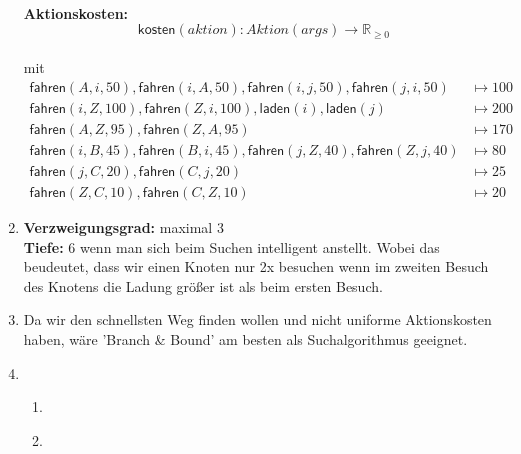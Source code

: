 \documentclass[a4paper,10pt]{article}
\begin{document}
\begin{enumerate}[~~a)]
\begin{enumerate}[~~1.]
\begin{align*}
    \end{align*}
    \end{enumerate}
    \textbf{Aktionskosten:} \\
    $$\textsf{kosten}(aktion): Aktion(args) \rightarrow \mathbb R_{\ge 0}$$\\   mit
    \begin{align*}
    \textsf{fahren}(A,i,50), \textsf{fahren}(i,A,50), \textsf{fahren}(i,j,50), \textsf{fahren}(j,i,50) &\mapsto 100\\
    \textsf{fahren}(i,Z,100), \textsf{fahren}(Z,i,100),\textsf{laden}(i), \textsf{laden}(j) &\mapsto 200\\
    \textsf{fahren}(A,Z,95), \textsf{fahren}(Z,A,95) &\mapsto 170\\
    \textsf{fahren}(i,B,45), \textsf{fahren}(B,i,45), \textsf{fahren}(j,Z,40), \textsf{fahren}(Z,j,40) &\mapsto 80\\
    \textsf{fahren}(j,C,20), \textsf{fahren}(C,j,20) &\mapsto 25\\
    \textsf{fahren}(Z,C,10), \textsf{fahren}(C,Z,10) &\mapsto 20
    \end{align*}

    \item \textbf{Verzweigungsgrad:} maximal 3 \\
    \textbf{Tiefe:} 6 wenn man sich beim Suchen intelligent anstellt. Wobei das beudeutet, dass wir einen Knoten nur 2x besuchen wenn im zweiten Besuch des Knotens die Ladung größer ist als beim ersten Besuch.

    \item
    Da wir den schnellsten Weg finden wollen und nicht uniforme Aktionskosten haben, wäre 'Branch \& Bound' am besten als Suchalgorithmus geeignet.
    \item ~\\
    \begin{enumerate}[1.]
        \item ~\\
        \begin{center}
        \end{center}
        \item ~\\
        \begin{center}
\end{center}
\end{enumerate}
\end{enumerate}
\end{document}
